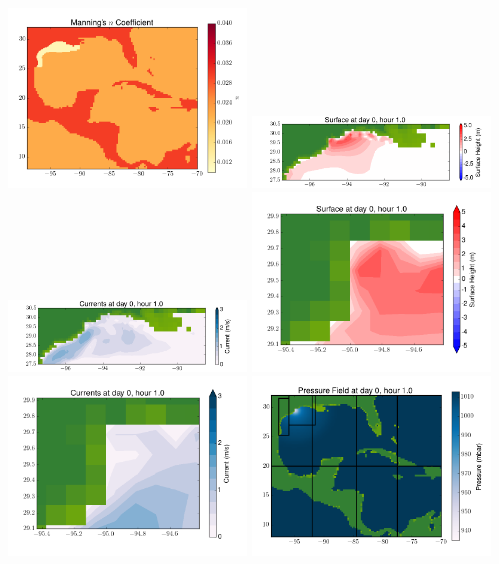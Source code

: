 \documentclass[11pt]{article}
\begin{document}
\vskip 10pt 
\includegraphics[width=0.475\textwidth]{frame0073fig3.png}
\includegraphics[width=0.475\textwidth]{frame0073fig4.png}
\vskip 10pt 
\includegraphics[width=0.475\textwidth]{frame0073fig5.png}
\includegraphics[width=0.475\textwidth]{frame0073fig6.png}
\vskip 10pt 
\includegraphics[width=0.475\textwidth]{frame0073fig7.png}
\includegraphics[width=0.475\textwidth]{frame0073fig8.png}
\end{document}
